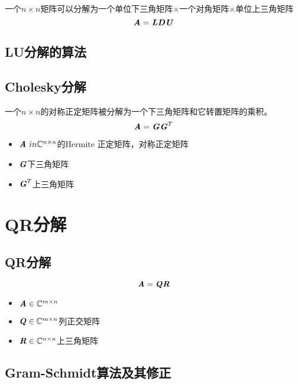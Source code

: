 \begin{definition}[LDU分解]
    一个$n \times n$矩阵可以分解为一个单位下三角矩阵$\times$一个对角矩阵$\times$单位上三角矩阵
    $$
    \boldsymbol{\mathit{A}} = \boldsymbol{\mathit{L}} \boldsymbol{\mathit{D}} \boldsymbol{\mathit{U}}
    $$
\end{definition}

\subsection{LU分解的算法}
\label{sub:LU分解的算法}

\subsection{Cholesky分解}
\label{sub:Cholesky分解}

\begin{definition}
    一个$n \times n$的对称正定矩阵被分解为一个下三角矩阵和它转置矩阵的乘积。
    $$
    \boldsymbol{\mathit{A}} = \boldsymbol{\mathit{G}} \boldsymbol{\mathit{G}}^T
    $$
    \begin{itemize}
        \item $\boldsymbol{\mathit{A}} \ in \mathbb{C}^{n \times n}$的Hermite 正定矩阵，对称正定矩阵
        \item $\boldsymbol{\mathit{G}}$下三角矩阵
        \item $\boldsymbol{\mathit{G}}^T$上三角矩阵
    \end{itemize}
\end{definition}

\section{QR分解}
\label{sec:QR分解}

\subsection{QR分解}
\label{sub:QR分解}

\begin{definition}[QR分解]
    $$
    \boldsymbol{\mathit{A}} = \boldsymbol{\mathit{Q}} \boldsymbol{\mathit{R}}
    $$
    \begin{itemize}
        \item $\boldsymbol{\mathit{A}} \in \mathbb{C}^{m \times n}$
        \item $\boldsymbol{\mathit{Q}} \in \mathbb{C}^{m \times n}$列正交矩阵
        \item $\boldsymbol{\mathit{R}} \in \mathbb{C}^{n \times n}$上三角矩阵
    \end{itemize}
\end{definition}

\subsection{Gram-Schmidt算法及其修正}
\label{sub:Gram-Schmidt算法及其修正}

